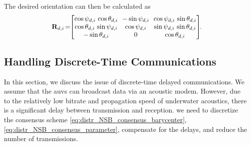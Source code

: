 The desired orientation can then be calculated as
\begin{equation}
    \mat{R}_{d, i\!} = \!\!\begin{bmatrix}
        \cos\psi_{d, i}\,\cos\theta_{d, i} & \!\!-\sin\psi_{d, i}\!\! & \cos\psi_{d, i}\,\sin\theta_{d, i}\\ \cos\theta_{d, i}\,\sin\psi_{d, i} & \!\!\cos\psi_{d, i}\!\! & \sin\psi_{d, i}\,\sin\theta_{d, i}\\ -\sin\theta_{d, i} & 0 & \cos\theta_{d, i}
    \end{bmatrix}\!\!\mathrlap{.}
\end{equation}


\subsection{Handling Discrete-Time Communications}
\label{sec:distr_NSB_event_triggered}
In this section, we discuss the issue of discrete-time delayed communications.
We assume that the \glspl{auv} can broadcast data via an acoustic modem.
However, due to the relatively low bitrate and propagation speed of underwater acoustics, there is a significant delay between transmission and reception.
 we need to discretize the consensus scheme \eqref{eq:distr_NSB_consensus_barycenter}, \eqref{eq:distr_NSB_consensus_parameter}, compensate for the delays, and reduce the number of transmissions.

